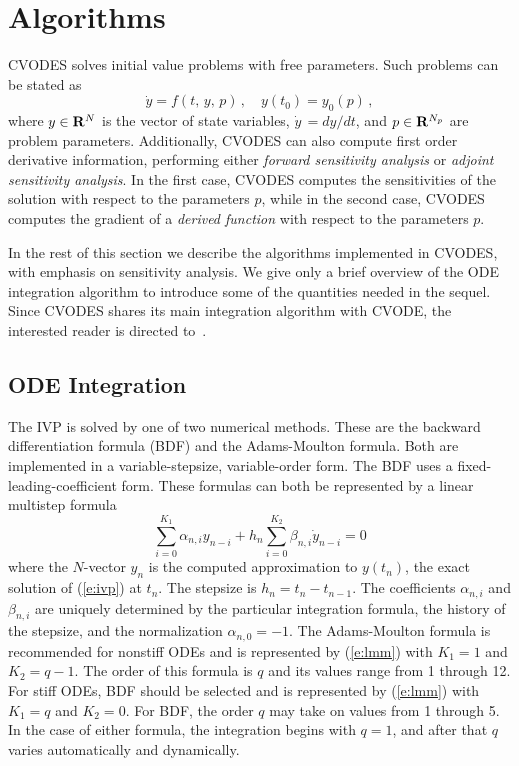 \section{Algorithms}\label{s:algorithms}

CVODES solves initial value problems with free parameters. 
Such problems can be stated as
\begin{equation}\label{e:ivp}
\dot{y}  = f(t,\,y,\,p) \, , \quad y(t_0)  = y_0(p) \, ,
\end{equation}
where $y \in {\bf R}^N$ is  the vector of state variables, 
$\dot{y}\,=dy/dt$,
and $p \in {\bf R}^{N_p}$ are problem parameters.
Additionally, CVODES can also compute first order derivative information, performing either
{\em forward sensitivity analysis} or {\em adjoint sensitivity analysis}.
In the first case, CVODES computes the sensitivities of the solution with respect 
to the parameters $p$, while in the second case, CVODES computes the gradient of a 
{\em derived function} with respect to the parameters $p$.

In the rest of this section we describe the algorithms implemented in CVODES,
with emphasis on sensitivity analysis. We give only a 
brief overview of the ODE integration algorithm to introduce some of the
quantities needed in the sequel. 
Since CVODES shares its main integration algorithm with CVODE, the interested reader is
directed to~\cite{HBGLSSW:04}.


\subsection{ODE Integration}\label{ss:integration}

The IVP is solved by one of two numerical methods. These are the
backward differentiation formula (BDF) and the Adams-Moulton formula. 
Both are implemented in a variable-stepsize, variable-order form. The BDF
uses a fixed-leading-coefficient form. These formulas can both be
represented by a linear multistep formula 
\begin{equation}\label{e:lmm}
\sum_{i=0}^{K_1}\alpha_{n,i}y_{n-i} + h_n\sum_{i=0}^{K_2}\beta_{n,i} 
\dot{y}_{n-i}=0
\end{equation}
where the $N$-vector $y_n$ is the computed approximation to $y(t_n)$,
the exact solution of (\ref{e:ivp}) at $t_n$. The stepsize is
$h_n=t_n-t_{n-1}$.  The coefficients $\alpha_{n,i}$ and $\beta_{n,i}$
are uniquely determined by the particular integration formula, the
history of the stepsize, and the normalization $\alpha_{n,0}=-1$. The
Adams-Moulton formula is recommended for nonstiff ODEs and is
represented by (\ref{e:lmm}) with $K_1=1$ and $K_2=q-1$. The order
of this formula is $q$ and its values range from 1 through 12. For
stiff ODEs, BDF should be selected and is represented by 
(\ref{e:lmm}) with $K_1=q$ and $K_2=0$. For BDF, the order $q$ may
take on values from 1 through 5. In the case of either formula, the
integration begins with $q=1$, and after that $q$ varies automatically
and dynamically.

